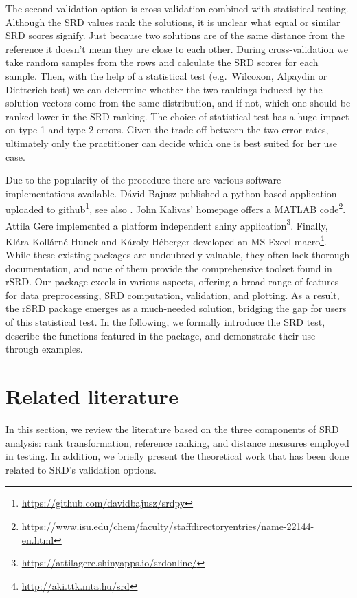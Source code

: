 The second validation option is cross-validation combined with statistical testing. Although the SRD values rank the solutions, it is unclear what equal or similar SRD scores signify. Just because two solutions are of the same distance from the reference it doesn't mean they are close to each other. During cross-validation we take random samples from the rows and calculate the SRD scores for each sample. Then, with the help of a statistical test (e.g.\ Wilcoxon,  Alpaydin or Dietterich-test) we can determine whether the two rankings induced by the solution vectors come from the same distribution, and if not, which one should be ranked lower in the SRD ranking. The choice of statistical test has a huge impact on type 1 and type 2 errors. Given the trade-off between the two error rates, ultimately only the practitioner can decide which one is best suited for her use case.

Due to the popularity of the procedure there are various software implementations available. Dávid Bajusz published a python based application uploaded to github\footnote{\url{https://github.com/davidbajusz/srdpy}}, see also \citep{GERE2021}. John Kalivas' homepage offers a MATLAB code\footnote{\url{https://www.isu.edu/chem/faculty/staffdirectoryentries/name-22144-en.html}}. Attila Gere implemented a platform independent shiny application\footnote{\url{ https://attilagere.shinyapps.io/srdonline/}}. Finally, Klára Kollárné Hunek and Károly Héberger developed an MS Excel macro\footnote{\url{http://aki.ttk.mta.hu/srd}}. While these existing packages are undoubtedly valuable, they often lack thorough documentation, and none of them provide the comprehensive toolset found in rSRD. Our package excels in various aspects, offering a broad range of features for data preprocessing, SRD computation, validation, and plotting. %
As a result, the rSRD package emerges as a much-needed solution, bridging the gap for users of this statistical test. In the following, we formally introduce the SRD test, describe the functions featured in the package, and demonstrate their use through examples.

\section{Related literature} \label{sec:Literature}

In this section, we review the literature based on the three components of SRD analysis: rank transformation, reference ranking, and distance measures employed in testing. In addition, we briefly present the theoretical work that has been done related to SRD's validation options.

